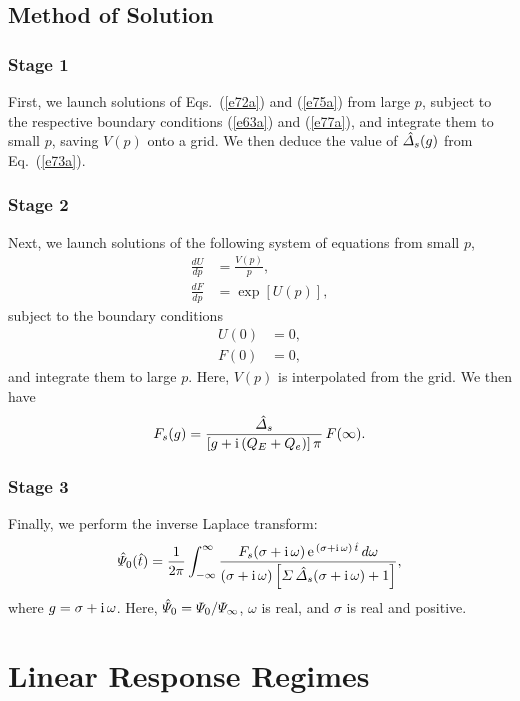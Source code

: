 \documentclass[titlepage=false,12pt]{article}
\begin{document}
\subsection{Method of Solution}
\subsubsection{Stage 1}
First, we launch solutions of Eqs.~(\ref{e72a}) and (\ref{e75a}) from large $p$, subject to the respective boundary conditions (\ref{e63a}) and (\ref{e77a}), and
integrate them to small $p$, saving $V(p)$ onto a grid. We then deduce the value of $\hat{\mit\Delta}_s(g)$ from Eq.~(\ref{e73a}). 

\subsubsection{Stage 2}
Next, we launch solutions of the following system of equations from small $p$, 
\begin{align}
\frac{dU}{dp} &= \frac{V(p)}{p},\\[0.5ex]
\frac{dF}{dp} &=\exp[U(p)],
\end{align}
subject to the boundary conditions
\begin{align}
U(0) &=0,\\[0.5ex]
F(0) &= 0,
\end{align}
and integrate them to large $p$. Here, $V(p)$ is interpolated from the grid. 
We then have 
\begin{equation}
F_s(g) = \frac{\hat{\mit\Delta}_s}{[g+{\rm i}\,(Q_E+Q_e)]\,\pi}\, F(\infty).
\end{equation}

\subsubsection{Stage 3}
Finally, we perform the inverse Laplace transform:
\begin{equation}
\hat{{\mit\Psi}}_0(\hat{t}) =\frac{1}{2\pi}\int_{-\infty}^{\infty}
\frac{F_s(\sigma+{\rm i}\,\omega)\,{\rm e}^{\,(\sigma+{\rm i}\,\omega)\,\hat{t}}\,d\omega}{(\sigma+{\rm i}\,\omega)\left[{\mit\Sigma}\,\hat{\mit\Delta}_s(\sigma+{\rm i}\,\omega)+1\right]},
\end{equation}
where $g=\sigma+{\rm i}\,\omega$. Here, $\hat{\mit\Psi}_0= {\mit\Psi}_0/{\mit\Psi}_{\infty}$, $\omega$ is real, and $\sigma$ is real and positive. 

\section{Linear Response Regimes}
\end{document}

